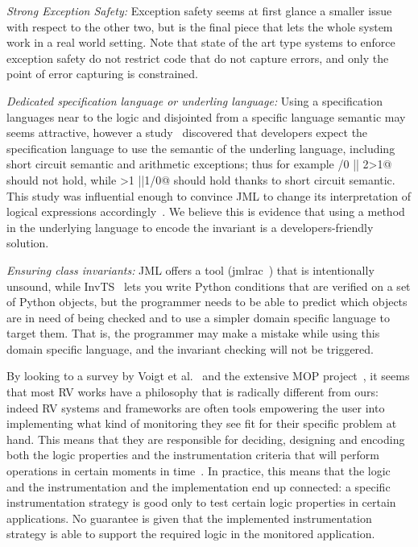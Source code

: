 \noindent\textit{Strong Exception Safety:}
Exception safety seems at first glance a smaller issue with respect 
to the other two, but is the final piece that lets the whole system work in a real world setting.
Note that state of the art type systems to enforce exception safety
 do not restrict code that do not capture errors, and
only the point of error capturing is constrained.


\noindent\textit{Dedicated specification language or underling language:}
Using a specification languages near to the logic and disjointed from a specific language
semantic may seems attractive, however
a study~\cite{chalin2007logical} discovered that developers expect
the specification language to use the semantic of the underling language, including
short circuit semantic and arithmetic exceptions; thus for example
/0 || 2>1@
should not hold, while 
>1 ||1/0@ should hold thanks to short circuit semantic.
This study was influential enough to convince JML to change its interpretation of logical expressions
accordingly~\cite{chalin2008jml}.
We believe this is evidence that using a method in the underlying language to encode the invariant is
a developers-friendly solution.



\noindent\textit{Ensuring class invariants:}
JML offers a tool (jmlrac~\cite{Burdy2005}) that is intentionally unsound,
while InvTS~\cite{gorbovitski08efficient} lets you write Python conditions
 that are verified on a set of Python objects, but the programmer needs to be able
 to predict which objects are in need of being checked and to use a simpler domain
 specific language to target them. That is, the programmer may make a mistake
while using this domain specific language, and the invariant checking
will not be triggered.

By looking to a survey by Voigt et al.~\cite{Voigt2013} and the extensive MOP project~\cite{meredith2012overview},
it seems that most RV works have a philosophy that is radically different from ours:
indeed RV systems and frameworks are often tools empowering the user
into implementing what kind of monitoring they see fit for their specific problem at hand.
This means that they are responsible for deciding, designing and encoding both the 
logic properties and the instrumentation criteria that will perform operations
in certain moments in time~\cite{meredith2012overview}.
In practice, this means that the logic and the instrumentation and the implementation end up connected:
a specific instrumentation strategy is good only to test certain logic properties in certain applications.
No guarantee is given that the implemented instrumentation strategy is able to support
the required logic in the monitored application.

